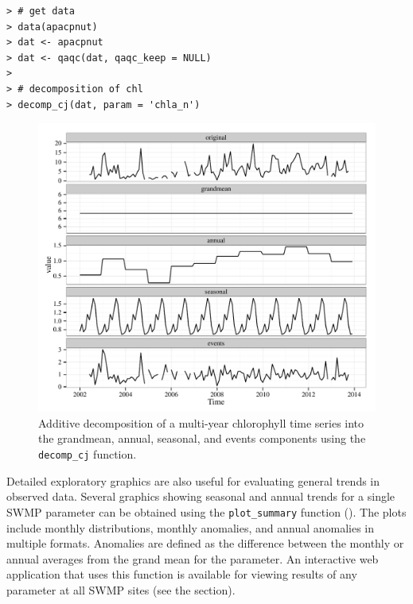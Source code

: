 \documentclass[10pt,letterpaper]{article}\usepackage[]{graphicx}\usepackage[]{color}
\makeatletter
\def\maxwidth{ %
  \ifdim\Gin@nat@width>\linewidth
    \linewidth
  \else
    \Gin@nat@width
  \fi
}
\newenvironment{kframe}{%
 \def\at@end@of@kframe{}%
 \ifinner\ifhmode%
  \def\at@end@of@kframe{\end{minipage}}%
  \begin{minipage}{\columnwidth}%
 \fi\fi%
 \def\FrameCommand##1{\hskip\@totalleftmargin \hskip-\fboxsep
 \colorbox{shadecolor}{##1}\hskip-\fboxsep
     \hskip-\linewidth \hskip-\@totalleftmargin \hskip\columnwidth}%
 \MakeFramed {\advance\hsize-\width
   \@totalleftmargin\z@ \linewidth\hsize
   \@setminipage}}%
 {\par\unskip\endMakeFramed%
 \at@end@of@kframe}
\newenvironment{knitrout}{}{} %
\makeatother
\begin{document}
\begin{knitrout}\small
{}\color{fgcolor}\begin{kframe}
\begin{verbatim}
> # get data
> data(apacpnut)
> dat <- apacpnut
> dat <- qaqc(dat, qaqc_keep = NULL)
> 
> # decomposition of chl
> decomp_cj(dat, param = 'chla_n')
\end{verbatim}
\end{kframe}\begin{figure}[!ht]


{\centering \includegraphics[width=\maxwidth]{figure/decomp_ex2} 

}

\caption[Additive decomposition of a multi-year chlorophyll time series into the grandmean, annual, seasonal, and events components using the \texttt{decomp\_cj} function]{Additive decomposition of a multi-year chlorophyll time series into the grandmean, annual, seasonal, and events components using the \texttt{decomp\_cj} function.\label{fig:decomp_ex2}}
\end{figure}


\end{knitrout}

Detailed exploratory graphics are also useful for evaluating general trends in observed data.  Several graphics showing seasonal and annual trends for a single SWMP parameter can be obtained using the \texttt{plot\_summary} function ().  The plots include monthly distributions, monthly anomalies, and annual anomalies in multiple formats.  Anomalies are defined as the difference between the monthly or annual averages from the grand mean for the parameter.  An interactive web application \cite{Chang15} that uses this function is available for viewing results of any parameter at all \ac{SWMP} sites (see the  section).
\end{document}
